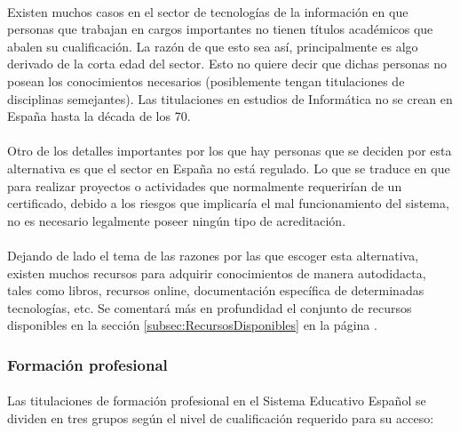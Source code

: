 \documentclass[12pt, a4paper]{report}
\begin{document}
                \paragraph{}
                Existen muchos casos en el sector de tecnologías de la información en que personas que trabajan en cargos importantes no tienen títulos académicos que abalen su cualificación. La razón de que esto sea así, principalmente es algo derivado de la corta edad del sector. Esto no quiere decir que dichas personas no posean los conocimientos necesarios (posiblemente tengan titulaciones de disciplinas semejantes). Las titulaciones en estudios de Informática no se crean en España hasta la década de los 70.
        	    
                \paragraph{}
                Otro de los detalles importantes por los que hay personas que se deciden por esta alternativa es que el sector en España no está regulado. Lo que se traduce en que para realizar proyectos o actividades que normalmente requerirían de un certificado, debido a los riesgos que implicaría el mal funcionamiento del sistema, no es necesario legalmente poseer ningún tipo de acreditación.
                
                \paragraph{}
				Dejando de lado el tema de las razones por las que escoger esta alternativa, existen muchos recursos para adquirir conocimientos de manera autodidacta, tales como libros, recursos online, documentación específica de determinadas tecnologías, etc. Se comentará más en profundidad el conjunto de recursos disponibles en la sección \ref{subsec:RecursosDisponibles} en la página \pageref{subsec:RecursosDisponibles}.

    		\subsubsection{Formación profesional}
        		
                \paragraph{}
                Las titulaciones de formación profesional en el Sistema Educativo Español se dividen en tres grupos según el nivel de cualificación requerido para su acceso:
                
\end{document}
